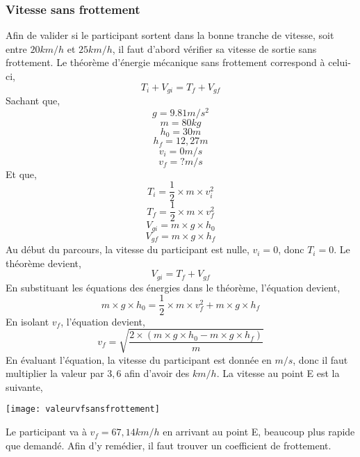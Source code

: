 \documentclass[12pt]{article}
\begin{document}
\subsubsection{Vitesse sans frottement}
Afin de valider si le participant sortent dans la bonne tranche de vitesse, soit entre $20km/h$ et $25km/h$, il faut d'abord vérifier sa vitesse de sortie sans frottement. Le théorème d'énergie mécanique sans frottement correspond à celui-ci, 
\begin{equation}
T_i + V_{gi} = T_f + V_{gf}
\end{equation}
Sachant que,
\begin{equation}
g = 9.81m/s^2
\end{equation}
\begin{equation}
m = 80kg
\end{equation}
\begin{equation}
h_0 = 30m
\end{equation}
\begin{equation}
h_f = 12,27m
\end{equation}
\begin{equation}
v_i = 0m/s
\end{equation}
\begin{equation}
v_f = ?m/s
\end{equation}
Et que,
\begin{equation}
T_i = \frac{1}{2} \times m \times v_i^2
\end{equation}
\begin{equation}
T_f = \frac{1}{2} \times m \times v_f^2
\end{equation}
\begin{equation}
V_{gi} = m \times g \times h_0
\end{equation}
\begin{equation}
V_{gf} = m \times g \times h_f
\end{equation}
Au début du parcours, la vitesse du participant est nulle, $v_i = 0$, donc $T_i = 0$. Le théorème devient,
\begin{equation}
V_{gi} = T_f + V_{gf}
\end{equation}
En substituant les équations des énergies dans le théorème, l'équation devient,
\begin{equation}
m \times g \times h_0 = \frac{1}{2} \times m \times v_f^2 + m \times g \times h_f
\end{equation}
En isolant $v_f$, l'équation devient,
\begin{equation}
v_f = \sqrt{\frac{2 \times (m \times g \times h_0 - m \times g \times h_f)}{m}}
\end{equation}
En évaluant l'équation, la vitesse du participant est donnée en $m/s$, donc il faut multiplier la valeur par $3,6$ afin d'avoir des $km/h$. La vitesse au point E est la suivante,
\newline
\begin{center}
	\texttt{[image: valeurvfsansfrottement]}
\end{center}
Le participant va à $v_f = 67,14km/h$ en arrivant au point E, beaucoup plus rapide que demandé. Afin d'y remédier, il faut trouver un coefficient de frottement.
\end{document}
